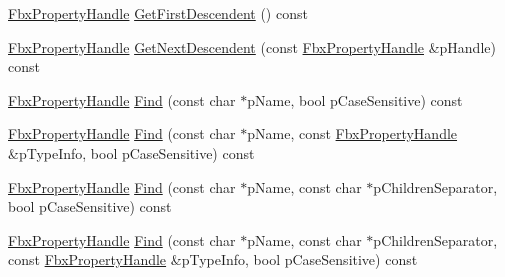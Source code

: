 \begin{Indent}
\begin{DoxyCompactItemize}
\item 
\hyperlink{class_fbx_property_handle}{Fbx\+Property\+Handle} \hyperlink{class_fbx_property_handle_a89892765ba818c194c4615bb84ea0c8c}{Get\+First\+Descendent} () const
\item 
\hyperlink{class_fbx_property_handle}{Fbx\+Property\+Handle} \hyperlink{class_fbx_property_handle_a9285a1cf6dbf3854335a0a05eaf1d95f}{Get\+Next\+Descendent} (const \hyperlink{class_fbx_property_handle}{Fbx\+Property\+Handle} \&p\+Handle) const
\item 
\hyperlink{class_fbx_property_handle}{Fbx\+Property\+Handle} \hyperlink{class_fbx_property_handle_a51b81ef0ee996b87dd832c6f99122437}{Find} (const char $\ast$p\+Name, bool p\+Case\+Sensitive) const
\item 
\hyperlink{class_fbx_property_handle}{Fbx\+Property\+Handle} \hyperlink{class_fbx_property_handle_acda982c21cb2db55366500ff9da43322}{Find} (const char $\ast$p\+Name, const \hyperlink{class_fbx_property_handle}{Fbx\+Property\+Handle} \&p\+Type\+Info, bool p\+Case\+Sensitive) const
\item 
\hyperlink{class_fbx_property_handle}{Fbx\+Property\+Handle} \hyperlink{class_fbx_property_handle_aa5206f41665802f16347ba4907e16519}{Find} (const char $\ast$p\+Name, const char $\ast$p\+Children\+Separator, bool p\+Case\+Sensitive) const
\item 
\hyperlink{class_fbx_property_handle}{Fbx\+Property\+Handle} \hyperlink{class_fbx_property_handle_a9607ca887e5b2f7b369770fab746b7e0}{Find} (const char $\ast$p\+Name, const char $\ast$p\+Children\+Separator, const \hyperlink{class_fbx_property_handle}{Fbx\+Property\+Handle} \&p\+Type\+Info, bool p\+Case\+Sensitive) const
\end{DoxyCompactItemize}
\end{Indent}
